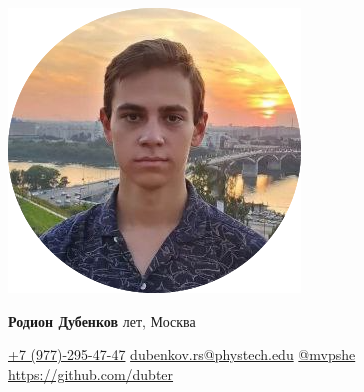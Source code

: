 \begin{minipage}[c]{2.75cm}
    \includegraphics[width=\linewidth]{photo}
\end{minipage}
\hspace{.5cm}
\begin{minipage}[c]{0.25\textwidth}
    {\Large\textbf{Родион Дубенков}} лет, Москва
\end{minipage}
\hfill
\begin{minipage}[c]{0.5\textwidth}
    \begin{flushright}
        \small\faPhone
        \href{tell:+7 (977)-295-47-47}{ +7 (977)-295-47-47} \newline
        \small\faEnvelope
        \href{mailto:dubenkov.rs@phystech.edu}{ dubenkov.rs@phystech.edu}\newline
        \ifdefined\privatecontact
        \privatecontact\newline
        \fi
        {\footnotesize\faPaperPlaneO} 
        \href{https://t.me/mvpshe}{ @mvpshe}\newline
        \small\faGithub 
        \href{https://github.com/dubter}{ https://github.com/dubter}\newline
    \end{flushright}
\end{minipage}